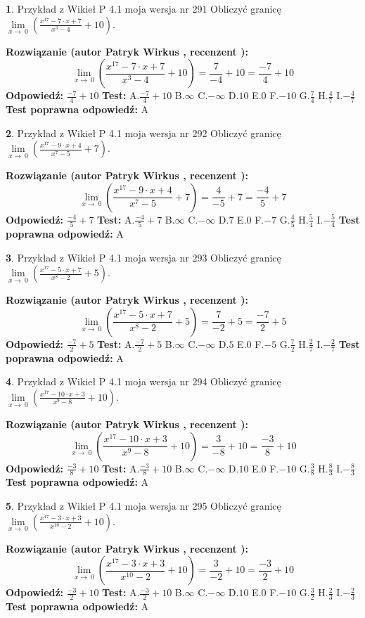 \documentclass[12pt, a4paper]{article}
\theoremstyle{definition} %
\newtheorem{zad}{}
\newcommand{\zadStart}[1]{\begin{zad}#1\newline}
\newcommand{\zadStop}{\end{zad}}
\newcommand{\rozwStart}[2]{\noindent \textbf{Rozwiązanie (autor #1 , recenzent #2): }\newline}
\newcommand{\rozwStop}{\newline}
\newcommand{\odpStart}{\noindent \textbf{Odpowiedź:}\newline}
\newcommand{\odpStop}{\newline}
\newcommand{\testStart}{\noindent \textbf{Test:}\newline}
\newcommand{\testStop}{\newline}
\newcommand{\kluczStart}{\noindent \textbf{Test poprawna odpowiedź:}\newline}
\newcommand{\kluczStop}{\newline}
\begin{document}
\zadStart{Przykład z Wikieł P 4.1 moja wersja nr 291}
Obliczyć granicę $\lim\limits_{x\to\ 0}(\frac{x^{17}-7 \cdot x +7}{x^{3}-4}+10)$.
\zadStop
\rozwStart{Patryk Wirkus}{}
$$\lim\limits_{x\to\ 0}(\frac{x^{17}-7 \cdot x +7}{x^{3}-4}+10)=\frac{7}{-4}+10=\frac{-7}{4}+10$$
\rozwStop
\odpStart
$\frac{-7}{4}+10$
\odpStop
\testStart
A.$\frac{-7}{4}+10$
B.$\infty$
C.$-\infty$
D.$10$
E.$0$
F.$-10$
G.$\frac{7}{4}$
H.$\frac{4}{7}$
I.$-\frac{4}{7}$
\testStop
\kluczStart
A
\kluczStop



\zadStart{Przykład z Wikieł P 4.1 moja wersja nr 292}
Obliczyć granicę $\lim\limits_{x\to\ 0}(\frac{x^{17}-9 \cdot x +4}{x^{7}-5}+7)$.
\zadStop
\rozwStart{Patryk Wirkus}{}
$$\lim\limits_{x\to\ 0}(\frac{x^{17}-9 \cdot x +4}{x^{7}-5}+7)=\frac{4}{-5}+7=\frac{-4}{5}+7$$
\rozwStop
\odpStart
$\frac{-4}{5}+7$
\odpStop
\testStart
A.$\frac{-4}{5}+7$
B.$\infty$
C.$-\infty$
D.$7$
E.$0$
F.$-7$
G.$\frac{4}{5}$
H.$\frac{5}{4}$
I.$-\frac{5}{4}$
\testStop
\kluczStart
A
\kluczStop



\zadStart{Przykład z Wikieł P 4.1 moja wersja nr 293}
Obliczyć granicę $\lim\limits_{x\to\ 0}(\frac{x^{17}-5 \cdot x +7}{x^{8}-2}+5)$.
\zadStop
\rozwStart{Patryk Wirkus}{}
$$\lim\limits_{x\to\ 0}(\frac{x^{17}-5 \cdot x +7}{x^{8}-2}+5)=\frac{7}{-2}+5=\frac{-7}{2}+5$$
\rozwStop
\odpStart
$\frac{-7}{2}+5$
\odpStop
\testStart
A.$\frac{-7}{2}+5$
B.$\infty$
C.$-\infty$
D.$5$
E.$0$
F.$-5$
G.$\frac{7}{2}$
H.$\frac{2}{7}$
I.$-\frac{2}{7}$
\testStop
\kluczStart
A
\kluczStop



\zadStart{Przykład z Wikieł P 4.1 moja wersja nr 294}
Obliczyć granicę $\lim\limits_{x\to\ 0}(\frac{x^{17}-10 \cdot x +3}{x^{9}-8}+10)$.
\zadStop
\rozwStart{Patryk Wirkus}{}
$$\lim\limits_{x\to\ 0}(\frac{x^{17}-10 \cdot x +3}{x^{9}-8}+10)=\frac{3}{-8}+10=\frac{-3}{8}+10$$
\rozwStop
\odpStart
$\frac{-3}{8}+10$
\odpStop
\testStart
A.$\frac{-3}{8}+10$
B.$\infty$
C.$-\infty$
D.$10$
E.$0$
F.$-10$
G.$\frac{3}{8}$
H.$\frac{8}{3}$
I.$-\frac{8}{3}$
\testStop
\kluczStart
A
\kluczStop



\zadStart{Przykład z Wikieł P 4.1 moja wersja nr 295}
Obliczyć granicę $\lim\limits_{x\to\ 0}(\frac{x^{17}-3 \cdot x +3}{x^{10}-2}+10)$.
\zadStop
\rozwStart{Patryk Wirkus}{}
$$\lim\limits_{x\to\ 0}(\frac{x^{17}-3 \cdot x +3}{x^{10}-2}+10)=\frac{3}{-2}+10=\frac{-3}{2}+10$$
\rozwStop
\odpStart
$\frac{-3}{2}+10$
\odpStop
\testStart
A.$\frac{-3}{2}+10$
B.$\infty$
C.$-\infty$
D.$10$
E.$0$
F.$-10$
G.$\frac{3}{2}$
H.$\frac{2}{3}$
I.$-\frac{2}{3}$
\testStop
\kluczStart
A
\kluczStop
\end{document}
